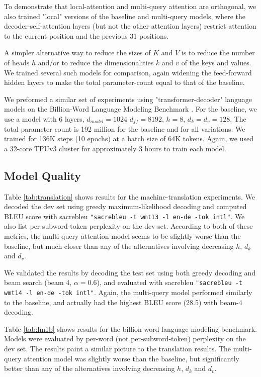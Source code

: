 To demonstrate that local-attention and multi-query attention are orthogonal, we also trained "local" versions of the baseline and multi-query models, where the decoder-self-attention layers (but not the other attention layers) restrict attention to the current position and the previous 31 positions.  

A simpler alternative way to reduce the sizes of $K$ and $V$ is to reduce the number of heads $h$ and/or to reduce the dimensionalities $k$ and $v$ of the keys and values.  We trained several such models for comparison, again widening the feed-forward hidden layers to make the total parameter-count equal to that of the baseline.

We preformed a similar set of experiments using "transformer-decoder" language models on the Billion-Word Language Modeling Benchmark \citep{LM1B}.    For the baseline, we use a model with 6 layers, $d_{model}=1024$ $d_{ff}=8192$, $h=8$, $d_k=d_v=128$.  The total parameter count is 192 million for the baseline and for all variations.  We trained for 136K steps (10 epochs) at a batch size of 64K tokens.  Again, we used a 32-core TPUv3 cluster for approximately 3 hours to train each model.

\subsection{Model Quality}

Table \ref{tab:translation} shows results for the machine-translation experiments.  We decoded the dev set using greedy maximum-likelihood decoding and computed BLEU score with sacrebleu \texttt{"sacrebleu -t wmt13 -l en-de -tok intl"}.  We also list per-subword-token perplexity on the dev set.  According to both of these metrics, the multi-query attention model seems to be slightly worse than the baseline, but much closer than any of the alternatives involving decreasing $h$, $d_k$ and $d_v$. 

We validated the results by decoding the test set using both greedy decoding and beam search (beam 4, $\alpha=0.6$), and evaluated with sacrebleu \texttt{"sacrebleu -t wmt14 -l en-de -tok intl"}.  Again, the multi-query model performed similarly to the baseline, and actually had the highest BLEU score (28.5) with beam-4 decoding.

Table \ref{tab:lm1b} shows results for the billion-word language modeling benchmark.  Models were evaluated by per-word (not per-subword-token) perplexity on the dev set.  The results paint a similar picture to the translation results.  The multi-query attention model was slightly worse than the baseline, but significantly better than any of the alternatives involving decreasing $h$, $d_k$ and $d_v$.

